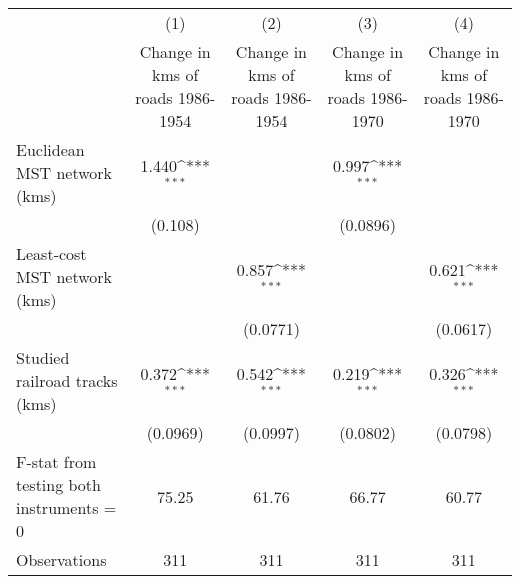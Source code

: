 {
\def\sym#1{\ifmmode^{#1}\else\(^{#1}\)\fi}
\begin{tabular}{l*{4}{c}}
\hline\hline
                &\multicolumn{1}{c}{(1)}&\multicolumn{1}{c}{(2)}&\multicolumn{1}{c}{(3)}&\multicolumn{1}{c}{(4)}\\
                &\multicolumn{1}{c}{Change in kms of roads 1986-1954}&\multicolumn{1}{c}{Change in kms of roads 1986-1954}&\multicolumn{1}{c}{Change in kms of roads 1986-1970}&\multicolumn{1}{c}{Change in kms of roads 1986-1970}\\
\hline
Euclidean MST network (kms)&    1.440\sym{***}&                  &    0.997\sym{***}&                  \\
                &  (0.108)         &                  & (0.0896)         &                  \\
[1em]
Least-cost MST network (kms)&                  &    0.857\sym{***}&                  &    0.621\sym{***}\\
                &                  & (0.0771)         &                  & (0.0617)         \\
[1em]
Studied railroad tracks (kms)&    0.372\sym{***}&    0.542\sym{***}&    0.219\sym{***}&    0.326\sym{***}\\
                & (0.0969)         & (0.0997)         & (0.0802)         & (0.0798)         \\
\hline
F-stat from testing both instruments = 0&    75.25         &    61.76         &    66.77         &    60.77         \\
Observations    &      311         &      311         &      311         &      311         \\
\hline\hline
\end{tabular}
}
